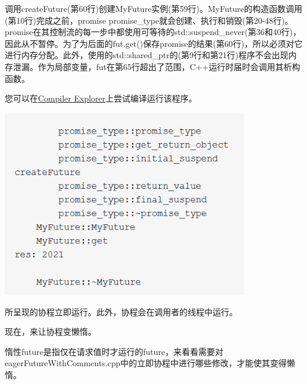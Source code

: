 调用createFuture(第60行)创建MyFuture实例(第59行)。MyFuture的构造函数调用(第10行)完成之前，promise promise\_type就会创建、执行和销毁(第20-48行)。promise在其控制流的每一步中都使用可等待的std::suspend\_never(第36和40行)，因此从不暂停。为了为后面的fut.get()保存promise的结果(第60行)，所以必须对它进行内存分配。此外，使用的std::shared\_ptr的(第9行和第21行)程序不会出现内存泄漏。作为局部变量，fut在第65行超出了范围，C++运行时届时会调用其析构函数。

您可以在\href{https://godbolt.org/z/Y9naEx}{Compiler Explorer}上尝试编译运行该程序。

\begin{center}
\includegraphics[width=0.8\textwidth]{content/3/chapter7/images/8.png}\\
\end{center}

所呈现的协程立即运行。此外，协程会在调用者的线程中运行。

现在，来让协程变懒惰。


惰性future是指仅在请求值时才运行的future，来看看需要对eagerFutureWithComments.cpp中的立即协程中进行哪些修改，才能使其变得懒惰。


